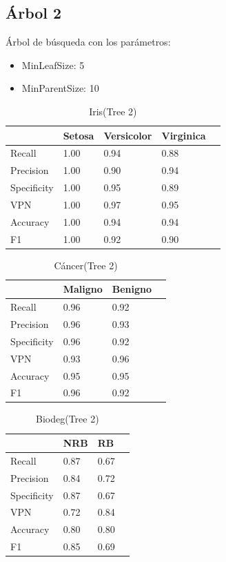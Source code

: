 \documentclass[a4paper,openwrite,12pt]{article}
\begin{document}
\subsection{Árbol 2}
Árbol de búsqueda con los parámetros:

\begin{itemize}
    \item MinLeafSize: 5
    \item MinParentSize: 10
\end{itemize}

\begin{table}[H]
\centering
\begin{tabular}{@{}lllll@{}}
\toprule
            & Setosa & Versicolor & Virginica &  \\ \midrule
Recall      & 1.00   & 0.94       & 0.88      &  \\
Precision   & 1.00   & 0.90       & 0.94      &  \\
Specificity & 1.00   & 0.95       & 0.89      &  \\
VPN         & 1.00   & 0.97       & 0.95      &  \\
Accuracy    & 1.00   & 0.94       & 0.94      &  \\
F1          & 1.00   & 0.92       & 0.90      &  \\ \bottomrule
\end{tabular}
\caption{Iris(Tree 2)}
\end{table}


\begin{table}[H]
\centering
\begin{tabular}{@{}llll@{}}
\toprule
            & Maligno & Benigno &  \\ \midrule
Recall      & 0.96    & 0.92    &  \\
Precision   & 0.96    & 0.93    &  \\
Specificity & 0.96    & 0.92    &  \\
VPN         & 0.93    & 0.96    &  \\
Accuracy    & 0.95    & 0.95    &  \\
F1          & 0.96    & 0.92    &  \\ \bottomrule
\end{tabular}
\caption{Cáncer(Tree 2)}
\end{table}

\begin{table}[H]
\centering
\begin{tabular}{@{}llll@{}}
\toprule
            & NRB &   RB &  \\ \midrule
Recall      & 0.87    & 0.67    &  \\
Precision   & 0.84    & 0.72    &  \\
Specificity & 0.87    & 0.67    &  \\
VPN         & 0.72    & 0.84    &  \\
Accuracy    & 0.80    & 0.80    &  \\
F1          & 0.85    & 0.69    &  \\ \bottomrule
\end{tabular}
\caption{Biodeg(Tree 2)}
\end{table}
\end{document}
